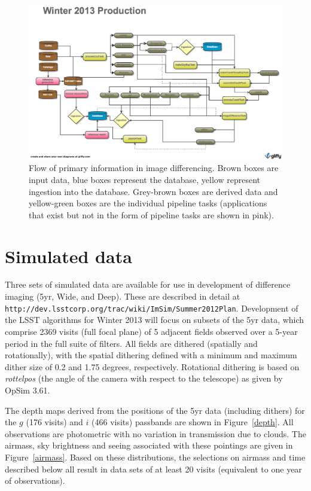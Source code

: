 \documentclass[prd, nofootinbib, floatfix, 11pt,tightenlines,times]{article}
\begin{document}
\begin{figure}
\includegraphics[width=\textwidth]{Figures/Winter_2013.png}
\caption{Flow of primary information in image differencing. Brown
  boxes are input data, blue boxes represent the database, yellow
  represent ingestion into the database. Grey-brown boxes are derived
  data and yellow-green boxes are the individual pipeline tasks (applications
  that exist but not in the form of pipeline tasks are shown in pink).}
\label{flow}
\end{figure}

\clearpage 

\section{Simulated data} 

Three sets of simulated data are available for use in development of
difference imaging (5yr, Wide, and Deep). These are described in
detail at {\tt
  http://dev.lsstcorp.org/trac/wiki/ImSim/Summer2012Plan}.
Development of the LSST algorithms for Winter 2013 will focus on
subsets of the 5yr data, which comprise 2369 visits (full focal plane)
of 5 adjacent fields observed over a 5-year period in the full suite
of filters. All fields are dithered (spatially and rotationally), with the
spatial dithering defined with a minimum and maximum dither size of
0.2 and 1.75 degrees, respectively. Rotational dithering is based on
{\it rottelpos} (the angle of the camera with respect to the
telescope) as given by OpSim 3.61.

The depth maps derived from the positions of the 5yr data (including
dithers) for the $g$ (176 visits) and $i$ (466 visits) passbands are
shown in Figure~\ref{depth}. All observations are photometric with no
variation in transmission due to clouds. The airmass, sky brightness
and seeing associated with these pointings are given in
Figure~\ref{airmass}. Based on these distributions, the selections on
airmass and time described below all result in data sets of at least
20 visits (equivalent to one year of observations).
\end{document}

